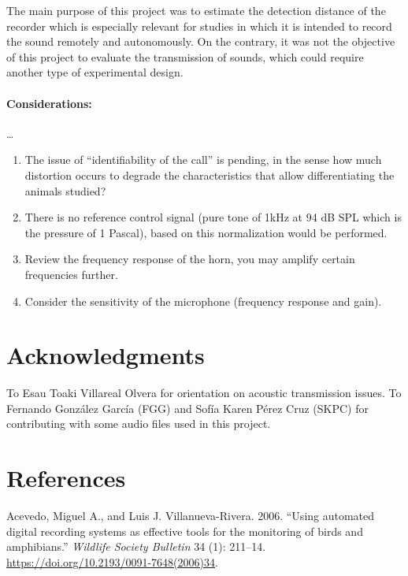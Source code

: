 \documentclass[fleqn,10pt,lineno]{wlpeerj} %
\begin{document}
The main purpose of this project was to estimate the detection distance of the recorder which is especially relevant for studies in which it is intended to record the sound remotely and autonomously. On the contrary, it was not the objective of this project to evaluate the transmission of sounds, which could require another type of experimental design.

\paragraph{Considerations:}

\dots

\begin{enumerate}
\def\labelenumi{\arabic{enumi}.}
\item
  The issue of ``identifiability of the call'' is pending, in the sense how much distortion occurs to degrade the characteristics that allow differentiating the animals studied?
\item
  There is no reference control signal (pure tone of 1kHz at 94 dB SPL which is the pressure of 1 Pascal), based on this normalization would be performed.
\item
  Review the frequency response of the horn, you may amplify certain frequencies further.
\item
  Consider the sensitivity of the microphone (frequency response and gain).
\end{enumerate}

\hypertarget{acknowledgments}{%
\section*{Acknowledgments}\label{acknowledgments}}

To Esau Toaki Villareal Olvera for orientation on acoustic transmission issues. To Fernando González García (FGG) and Sofía Karen Pérez Cruz (SKPC) for contributing with some audio files used in this project.

\hypertarget{references}{%
\section*{References}\label{references}}

\hypertarget{refs}{}
\leavevmode\hypertarget{ref-Acevedo2006}{}%
Acevedo, Miguel A., and Luis J. Villanueva-Rivera. 2006. ``Using automated digital recording systems as effective tools for the monitoring of birds and amphibians.'' \emph{Wildlife Society Bulletin} 34 (1): 211--14. \url{https://doi.org/10.2193/0091-7648(2006)34}.
\end{document}
